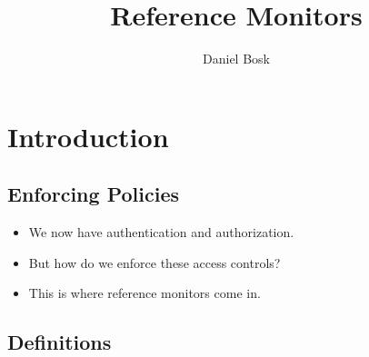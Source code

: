 \title{%
  Reference Monitors
}
\author{Daniel Bosk}

\begin{frame}
  \maketitle
\end{frame}

\mode*

\begin{abstract}
  
\end{abstract}






\section{Introduction}

\subsection{Enforcing Policies}

\begin{frame}
  \begin{itemize}
    \item We now have authentication and authorization.
    \item But how do we enforce these access controls?
    \item This is where reference monitors come in.
  \end{itemize}
\end{frame}

\subsection{Definitions}


